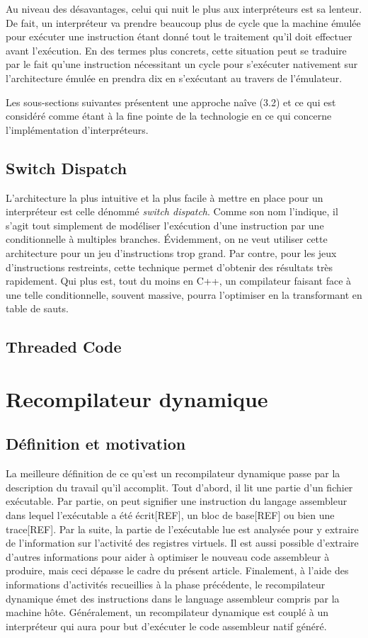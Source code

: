 \documentclass{article} %
\begin{document}
Au niveau des désavantages, celui qui nuit le plus aux interpréteurs est sa lenteur. De fait, un interpréteur va prendre beaucoup plus de cycle que la machine émulée pour exécuter une instruction étant donné tout le traitement qu'il doit effectuer avant l'exécution. En des termes plus concrets, cette situation peut se traduire par le fait qu'une instruction nécessitant un cycle pour s'exécuter nativement sur l'architecture émulée en prendra dix en s'exécutant au travers de l'émulateur.

Les sous-sections suivantes présentent une approche naîve (3.2) et ce qui est considéré comme étant à la fine pointe de la technologie en ce qui concerne l'implémentation d'interpréteurs.

\subsection{Switch Dispatch}
L'architecture la plus intuitive et la plus facile à mettre en place pour un interpréteur est celle dénommé \textit{switch dispatch}. Comme son nom l'indique, il s'agit tout simplement de modéliser l'exécution d'une instruction par une conditionnelle à multiples branches. Évidemment, on ne veut utiliser cette architecture pour un jeu d'instructions trop grand. Par contre, pour les jeux d'instructions restreints, cette technique permet d'obtenir des résultats très rapidement. Qui plus est, tout du moins en C++, un compilateur faisant face à une telle conditionnelle, souvent massive, pourra l'optimiser en la transformant en table de sauts. 

\subsection{Threaded Code}


\section{Recompilateur dynamique}
\subsection{Définition et motivation}
La meilleure définition de ce qu'est un recompilateur dynamique passe par la description du travail qu'il accomplit. Tout d'abord, il lit une partie d'un fichier exécutable. Par partie, on peut signifier une instruction du langage assembleur dans lequel l'exécutable a été écrit[REF], un bloc de base[REF] ou bien une trace[REF]. Par la suite, la partie de l'exécutable lue est analysée pour y extraire de l'information sur l'activité des registres virtuels. Il est aussi possible d'extraire d'autres informations pour aider à optimiser le nouveau code assembleur à produire, mais ceci dépasse le cadre du présent article. Finalement, à l'aide des informations d'activités recueillies à la phase précédente, le recompilateur dynamique émet des instructions dans le language assembleur compris par la machine hôte. Généralement, un recompilateur dynamique est couplé à un interpréteur qui aura pour but d'exécuter le code assembleur natif généré.
\end{document}
